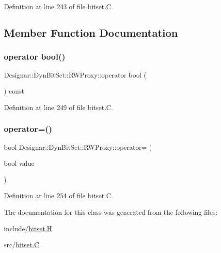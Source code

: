 Definition at line 243 of file bitset.\+C.



\subsection{Member Function Documentation}
\mbox{\label{class_designar_1_1_dyn_bit_set_1_1_r_w_proxy_ae2b7bc44f30f8b75d8fc2306167f9598}} 
\subsubsection{\texorpdfstring{operator bool()}{operator bool()}}
{\footnotesize\ttfamily Designar\+::\+Dyn\+Bit\+Set\+::\+R\+W\+Proxy\+::operator bool (\begin{DoxyParamCaption}{ }\end{DoxyParamCaption}) const}



Definition at line 249 of file bitset.\+C.

\mbox{\label{class_designar_1_1_dyn_bit_set_1_1_r_w_proxy_ad9dff242f5550a97af94c1e4ecd163ad}} 
\subsubsection{\texorpdfstring{operator=()}{operator=()}}
{\footnotesize\ttfamily bool Designar\+::\+Dyn\+Bit\+Set\+::\+R\+W\+Proxy\+::operator= (\begin{DoxyParamCaption}\item[{bool}]{value }\end{DoxyParamCaption})}



Definition at line 254 of file bitset.\+C.



The documentation for this class was generated from the following files\+:\begin{DoxyCompactItemize}
\item 
include/\hyperlink{bitset_8_h}{bitset.\+H}\item 
src/\hyperlink{bitset_8_c}{bitset.\+C}\end{DoxyCompactItemize}
